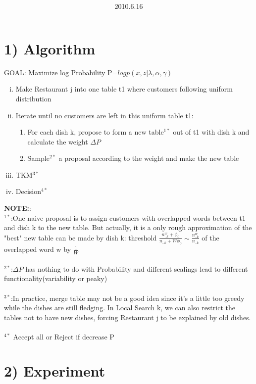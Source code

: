 \documentclass{article}
\title{\vspace{0.3in}\textmd{\textbf{\hmwkTitle}}}
\date{2010.6.16}
\author{\textbf{\hmwkAuthorName}}
\begin{document}
\begin{spacing}{1.1}
\maketitle


\section{1) Algorithm}
GOAL: Maximize log Probability P=$log p(x,z|\lambda,\alpha,\gamma)$
\begin{enumerate}[(i)]
\item Make Restaurant j into one table t1 where customers following uniform distribution
\item Iterate until no customers are left in this uniform table t1:
\begin{enumerate}
\item For each dish k, propose to form a new table$^{1*}$ out of t1 with dish k and calculate the weight $\Delta P$
\item Sample$^{2*}$ a proposal according to the weight and make the new table
\end{enumerate}
\item TKM$^{3*}$
\item Decision$^{4*}$
\end{enumerate}
{\bf NOTE:}:\\
$^{1*}$:One naive proposal is to assign customers with overlapped words between t1 and dish k to the new table. But actually, it is a only rough 
approximation of the "best" new table can be made by dish k: threshold $\frac{n_{..k}^{w}+\phi_{0}}{{n_{..k}+W\phi_{0}}}\sim\frac{n_{..k}^{w}}{n_{..k}}$ of the overlapped word w by $\frac{1}{W}$\\ \\
$^{2*}$:$\Delta P$ has nothing to do with Probability and different scalings lead to different functionality(variability or peaky)\\ \\
$^{3*}$:In practice, merge table may not be a good idea since it's a little too greedy while the dishes are still fledging. In Local Search k,
we can also restrict the tables not to have new dishes, forcing Restaurant j to be explained by old dishes.\\ \\
$^{4*}$ Accept all or Reject if decrease P

\section{2) Experiment}

\end{spacing}
\end{document}
